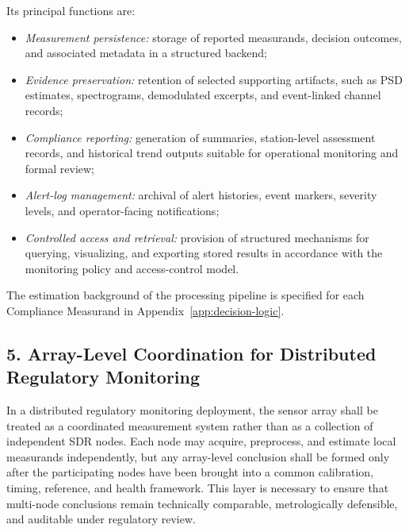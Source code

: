 \documentclass[11pt]{report}
\begin{document}
\begin{description}
	Its principal functions are:
	\begin{itemize}
		\item \textit{Measurement persistence:} storage of reported measurands, decision outcomes, and associated metadata in a structured backend;
		
		\item \textit{Evidence preservation:} retention of selected supporting artifacts, such as PSD estimates, spectrograms, demodulated excerpts, and event-linked channel records;
		
		\item \textit{Compliance reporting:} generation of summaries, station-level assessment records, and historical trend outputs suitable for operational monitoring and formal review;
		
		\item \textit{Alert-log management:} archival of alert histories, event markers, severity levels, and operator-facing notifications;
		
		\item \textit{Controlled access and retrieval:} provision of structured mechanisms for querying, visualizing, and exporting stored results in accordance with the monitoring policy and access-control model.
	\end{itemize}
	
\end{description}

The estimation background of the processing pipeline is specified for each Compliance Measurand in Appendix~\ref{app:decision-logic}.

\subsection*{5. Array-Level Coordination for Distributed Regulatory Monitoring}\;

\noindent In a distributed regulatory monitoring deployment, the sensor array shall be treated as a coordinated measurement system rather than as a collection of independent SDR nodes. Each node may acquire, preprocess, and estimate local measurands independently, but any array-level conclusion shall be formed only after the participating nodes have been brought into a common calibration, timing, reference, and health framework. This layer is necessary to ensure that multi-node conclusions remain technically comparable, metrologically defensible, and auditable under regulatory review.
\end{document}
